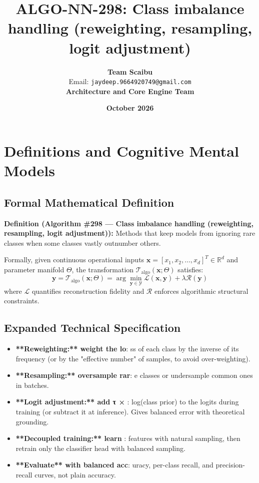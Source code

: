 \documentclass[11pt,a4paper]{article}
\title{\textbf{ALGO-NN-298: Class imbalance handling (reweighting, resampling, logit adjustment)}}
\author{\textbf{Team Scaibu} \\ \small Email: \texttt{jaydeep.9664920749@gmail.com} \\ \small \textbf{Architecture and Core Engine Team}}
\date{\textbf{October 2026}}
\theoremstyle{definition}
\begin{document}
\maketitle

\section{Definitions and Cognitive Mental Models}

\subsection{Formal Mathematical Definition}
\textbf{Definition (Algorithm \#298 --- Class imbalance handling (reweighting, resampling, logit adjustment)):}
Methods that keep models from ignoring rare classes when some classes vastly outnumber others.

Formally, given continuous operational inputs $\mathbf{x} = [x_1, x_2, \dots, x_d]^T \in \mathbb{R}^d$ and parameter manifold $\Theta$, the transformation $\mathcal{T}_{\text{algo}}(\mathbf{x}; \Theta)$ satisfies:
{\boldmath
\begin{equation}
\mathbf{y} = \mathcal{T}_{\text{algo}}(\mathbf{x}; \Theta) = \arg\min_{\mathbf{y} \in \mathcal{Y}} \mathcal{L}(\mathbf{x}, \mathbf{y}) + \lambda \mathcal{R}(\mathbf{y})
\end{equation}
}
where $\mathcal{L}$ quantifies reconstruction fidelity and $\mathcal{R}$ enforces algorithmic structural constraints.

\subsection{Expanded Technical Specification}
\begin{itemize}
\item \textbf{**Reweighting:** weight the lo}: ss of each class by the inverse of its frequency (or by the "effective number" of samples, to avoid over-weighting).
\item \textbf{**Resampling:** oversample rar}: e classes or undersample common ones in batches.
\item \textbf{**Logit adjustment:** add τ × }: log(class prior) to the logits during training (or subtract it at inference). Gives balanced error with theoretical grounding.
\item \textbf{**Decoupled training:** learn }: features with natural sampling, then retrain only the classifier head with balanced sampling.
\item \textbf{**Evaluate** with balanced acc}: uracy, per-class recall, and precision-recall curves, not plain accuracy.
\end{itemize}
\end{document}
